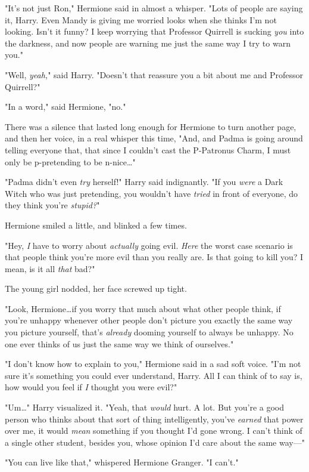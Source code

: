 "It's not just Ron," Hermione said in almost a whisper. "Lots of people are
saying it, Harry. Even Mandy is giving me worried looks when she thinks I'm not
looking. Isn't it funny? I keep worrying that Professor Quirrell is sucking
\emph{you} into the darkness, and now people are warning me just the same way I
try to warn you."

"Well, \emph{yeah,}" said Harry. "Doesn't that reassure you a bit about me and
Professor Quirrell?"

"In a word," said Hermione, "no."

There was a silence that lasted long enough for Hermione to turn another page,
and then her voice, in a real whisper this time, "And, and Padma is going
around telling everyone that, that since I couldn't cast the P-Patronus Charm,
I must only be p-pretending to be n-nice…"

"Padma didn't even \emph{try} herself!" Harry said indignantly. "If you
\emph{were} a Dark Witch who was just pretending, you wouldn't have
\emph{tried} in front of everyone, do they think you're \emph{stupid?}"

Hermione smiled a little, and blinked a few times.

"Hey, \emph{I} have to worry about \emph{actually} going evil. \emph{Here} the
worst case scenario is that people think you're more evil than you really are.
Is that going to kill you? I mean, is it all \emph{that} bad?"

The young girl nodded, her face screwed up tight.

"Look, Hermione…if you worry that much about what other people think,
if you're unhappy whenever other people don't picture you exactly the same way
you picture yourself, that's \emph{already} dooming yourself to always be
unhappy. No one ever thinks of us just the same way we think of ourselves."

"I don't know how to explain to you," Hermione said in a sad soft voice. "I'm
not sure it's something you could ever understand, Harry. All I can think of to
say is, how would you feel if \emph{I} thought you were evil?"

"Um…" Harry visualized it. "Yeah, that \emph{would} hurt. A lot. But
you're a good person who thinks about that sort of thing intelligently, you've
\emph{earned} that power over me, it would \emph{mean} something if you thought
I'd gone wrong. I can't think of a single other student, besides you, whose
opinion I'd care about the same way---"

"You can live like that," whispered Hermione Granger. "I can't."

